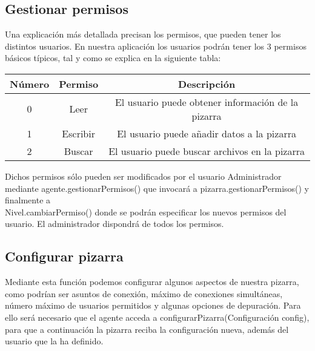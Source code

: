 \subsection{Gestionar permisos}
Una explicación más detallada precisan los permisos, que pueden tener los distintos usuarios. En nuestra aplicación los usuarios podrán tener los 3 permisos básicos típicos, tal y como se explica en la siguiente tabla: \\

\begin{center}
\begin{tabular}{|c|c|c|}
\hline
Número & Permiso  & Descripción \\
\hline
0& Leer & El usuario puede obtener información de la pizarra\\
1& Escribir & El usuario puede añadir datos a la pizarra\\
2& Buscar & El usuario puede buscar archivos en la pizarra\\
\hline
\end{tabular}
\end{center}

Dichos permisos sólo pueden ser modificados por el usuario Administrador mediante agente.gestionarPermisos() que invocará a pizarra.gestionarPermisos() y  finalmente a \\ Nivel.cambiarPermiso() donde se podrán especificar los nuevos permisos del usuario. El administrador dispondrá de todos los permisos.

\subsection{Configurar pizarra}
Mediante esta función podemos configurar algunos aspectos de nuestra pizarra, como podrían ser asuntos de conexión, máximo de conexiones simultáneas, número máximo de usuarios permitidos y algunas opciones de depuración. Para ello será necesario que el agente acceda a configurarPizarra(Configuración config), para que a continuación la pizarra reciba la configuración nueva, además del usuario que la ha definido.

